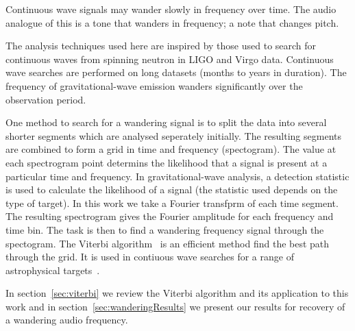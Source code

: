 \documentclass[paper-main.tex]{subfiles}
\begin{document}
 
Continuous wave signals may wander slowly in frequency over time. 
The audio analogue of this is a tone that wanders in frequency; a note that changes pitch. 


The analysis techniques used here are inspired by those used to search for continuous waves from spinning neutron in LIGO and Virgo data.
Continuous wave searches are performed on long datasets (months to years in duration). 
The frequency of gravitational-wave emission wanders significantly over the observation period. 

One method to search for a wandering signal is to split the data into several shorter segments which are analysed seperately initially. 
The resulting segments are combined to form a grid in time and frequency (spectogram). 
The value at each spectrogram point determins the likelihood that a signal is present at a particular time and frequency. 
In gravitational-wave analysis, a detection statistic is used to calculate the likelihood of a signal (the statistic used depends on the type of target). 
In this work we take a Fourier transfprm of each time segment.
The resulting spectrogram gives the Fourier amplitude for each frequency and time bin. 
The task is then to find a wandering frequency signal through the spectogram. 
The Viterbi algorithm~\cite{Viterbi:1967} is an efficient method find the best path through the grid. 
It is used in contiuous wave searches for a range of astrophysical targets~\cite{ScoX1O2Viterbi:2019,ScoX1ViterbiO1:2017,MillhouseStrangMelatos:2020,PostMergerRemnantSearch:2019,SunEtAlSNR:2018,viterbi_application}. 
 

In section~\ref{sec:viterbi} we review the Viterbi algorithm and its application to this work and in section~\ref{sec:wanderingResults} we present our results for recovery of a wandering audio frequency. 
\end{document}
